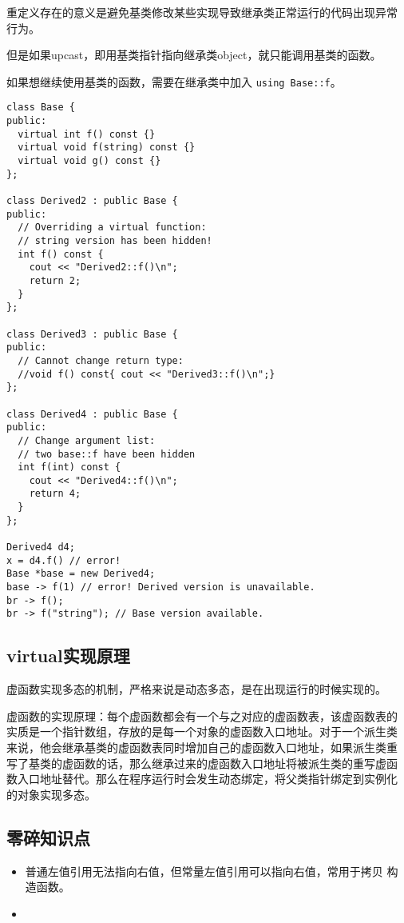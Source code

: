 重定义存在的意义是避免基类修改某些实现导致继承类正常运行的代码出现异常
行为。

但是如果upcast，即用基类指针指向继承类object，就只能调用基类的函数。

如果想继续使用基类的函数，需要在继承类中加入 \texttt{using Base::f}。
\begin{verbatim}
class Base {
public:
  virtual int f() const {}
  virtual void f(string) const {}
  virtual void g() const {}
};

class Derived2 : public Base {
public:
  // Overriding a virtual function:
  // string version has been hidden!
  int f() const {
    cout << "Derived2::f()\n";
    return 2;
  }
};

class Derived3 : public Base {
public:
  // Cannot change return type:
  //void f() const{ cout << "Derived3::f()\n";}
};

class Derived4 : public Base {
public:
  // Change argument list:
  // two base::f have been hidden
  int f(int) const {
    cout << "Derived4::f()\n";
    return 4;
  }
};

Derived4 d4;
x = d4.f() // error!
Base *base = new Derived4;
base -> f(1) // error! Derived version is unavailable.
br -> f();
br -> f("string"); // Base version available.
\end{verbatim}

\subsection{virtual实现原理}
\label{sec:vptr}
虚函数实现多态的机制，严格来说是动态多态，是在出现运行的时候实现的。

虚函数的实现原理：每个虚函数都会有一个与之对应的虚函数表，该虚函数表的
实质是一个指针数组，存放的是每一个对象的虚函数入口地址。对于一个派生类
来说，他会继承基类的虚函数表同时增加自己的虚函数入口地址，如果派生类重
写了基类的虚函数的话，那么继承过来的虚函数入口地址将被派生类的重写虚函
数入口地址替代。那么在程序运行时会发生动态绑定，将父类指针绑定到实例化
的对象实现多态。 

\subsection{零碎知识点}

\begin{itemize}
\item 普通左值引用无法指向右值，但常量左值引用可以指向右值，常用于拷贝
  构造函数。
\item 
\end{itemize}
